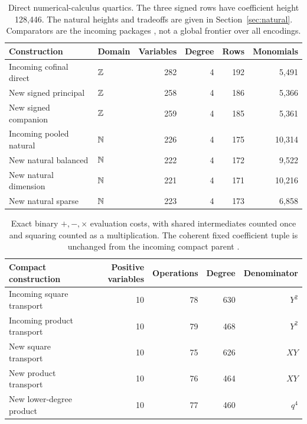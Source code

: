 \begin{table}[htbp]
\centering
\small
\begin{tabular}{@{}llrrrr@{}}
\toprule
Construction & Domain & Variables & Degree & Rows & Monomials \\
\midrule
Incoming cofinal direct & $\mathbb Z$ & 282 & 4 & 192 & 5,491 \\
New signed principal & $\mathbb Z$ & 258 & 4 & 186 & 5,366 \\
New signed companion & $\mathbb Z$ & 259 & 4 & 185 & 5,361 \\
Incoming pooled natural & $\mathbb N$ & 226 & 4 & 175 & 10,314 \\
New natural balanced & $\mathbb N$ & 222 & 4 & 172 & 9,522 \\
New natural dimension & $\mathbb N$ & 221 & 4 & 171 & 10,216 \\
New natural sparse & $\mathbb N$ & 223 & 4 & 173 & 6,858 \\
\bottomrule
\end{tabular}
\caption{Direct numerical-calculus quartics. The three signed rows have
coefficient height 128,446. The natural heights and tradeoffs are given in
Section~\ref{sec:natural}. Comparators are the incoming packages
\cite{cofinal,graphdigits}, not a global frontier over all encodings.}
\end{table}

\begin{table}[htbp]
\centering
\small
\begin{tabular}{@{}lrrrr@{}}
\toprule
Compact construction & Positive variables & Operations & Degree & Denominator \\
\midrule
Incoming square transport & 10 & 78 & 630 & $Y^2$ \\
Incoming product transport & 10 & 79 & 468 & $Y^2$ \\
New square transport & 10 & 75 & 626 & $XY$ \\
New product transport & 10 & 76 & 464 & $XY$ \\
New lower-degree product & 10 & 77 & 460 & $q^4$ \\
\bottomrule
\end{tabular}
\caption{Exact binary $+,-,\times$ evaluation costs, with shared
intermediates counted once and squaring counted as a multiplication.
The coherent fixed coefficient tuple is unchanged from the incoming
compact parent \cite{certificate}.}
\end{table}
